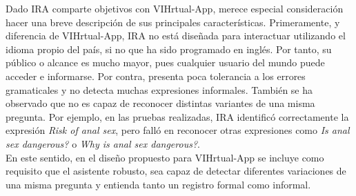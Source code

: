 Dado  IRA comparte objetivos con VIHrtual-App, merece especial consideración hacer una breve descripción de sus principales características. Primeramente, y diferencia de VIHrtual-App, IRA no está diseñada para interactuar utilizando el idioma propio del país, si no que ha sido programado en inglés. Por tanto, su público o alcance es mucho mayor, pues cualquier usuario del mundo puede acceder e informarse. Por contra, presenta poca tolerancia a los errores gramaticales y no detecta muchas expresiones informales. También se ha observado que no es capaz de reconocer distintas variantes de una misma pregunta. Por ejemplo, en las pruebas realizadas, IRA identificó correctamente la expresión \textit{Risk of anal sex}, pero falló en reconocer otras expresiones como \textit{Is anal sex dangerous?} o \textit{Why is anal sex dangerous?}.\\

En este sentido, en el diseño propuesto para VIHrtual-App se incluye como requisito que el asistente robusto, sea capaz de detectar diferentes variaciones de una misma pregunta y entienda tanto un registro formal como informal.\\ 

